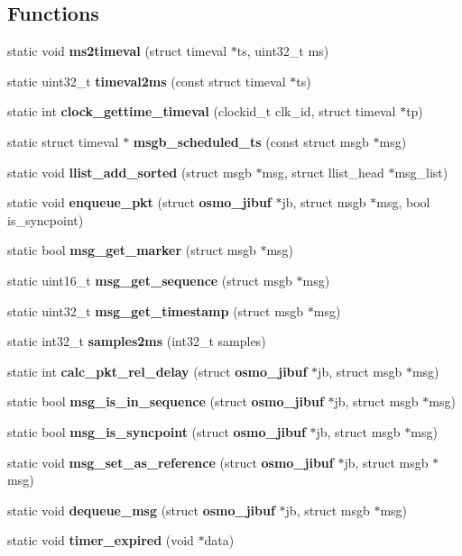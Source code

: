 \subsection*{Functions}
\begin{DoxyCompactItemize}
\item 
static void {\bfseries ms2timeval} (struct timeval $\ast$ts, uint32\+\_\+t ms)
\item 
static uint32\+\_\+t {\bfseries timeval2ms} (const struct timeval $\ast$ts)
\item 
static int {\bfseries clock\+\_\+gettime\+\_\+timeval} (clockid\+\_\+t clk\+\_\+id, struct timeval $\ast$tp)
\item 
static struct timeval $\ast$ {\bfseries msgb\+\_\+scheduled\+\_\+ts} (const struct msgb $\ast$msg)
\item 
static void {\bfseries llist\+\_\+add\+\_\+sorted} (struct msgb $\ast$msg, struct llist\+\_\+head $\ast$msg\+\_\+list)
\item 
static void {\bfseries enqueue\+\_\+pkt} (struct {\bf osmo\+\_\+jibuf} $\ast$jb, struct msgb $\ast$msg, bool is\+\_\+syncpoint)
\item 
static bool {\bfseries msg\+\_\+get\+\_\+marker} (struct msgb $\ast$msg)
\item 
static uint16\+\_\+t {\bfseries msg\+\_\+get\+\_\+sequence} (struct msgb $\ast$msg)
\item 
static uint32\+\_\+t {\bfseries msg\+\_\+get\+\_\+timestamp} (struct msgb $\ast$msg)
\item 
static int32\+\_\+t {\bfseries samples2ms} (int32\+\_\+t samples)
\item 
static int {\bfseries calc\+\_\+pkt\+\_\+rel\+\_\+delay} (struct {\bf osmo\+\_\+jibuf} $\ast$jb, struct msgb $\ast$msg)
\item 
static bool {\bfseries msg\+\_\+is\+\_\+in\+\_\+sequence} (struct {\bf osmo\+\_\+jibuf} $\ast$jb, struct msgb $\ast$msg)
\item 
static bool {\bfseries msg\+\_\+is\+\_\+syncpoint} (struct {\bf osmo\+\_\+jibuf} $\ast$jb, struct msgb $\ast$msg)
\item 
static void {\bfseries msg\+\_\+set\+\_\+as\+\_\+reference} (struct {\bf osmo\+\_\+jibuf} $\ast$jb, struct msgb $\ast$msg)
\item 
static void {\bfseries dequeue\+\_\+msg} (struct {\bf osmo\+\_\+jibuf} $\ast$jb, struct msgb $\ast$msg)
\item 
static void {\bfseries timer\+\_\+expired} (void $\ast$data)
\item 

\end{DoxyCompactItemize}
